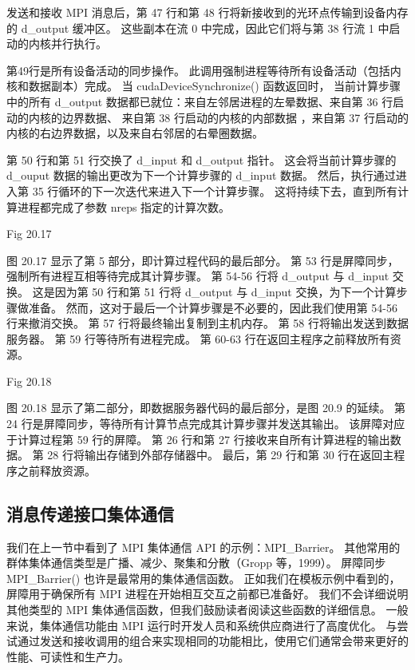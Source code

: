 发送和接收 MPI 消息后，第 47 行和第 48 行将新接收到的光环点传输到设备内存的 d\_output 缓冲区。 
这些副本在流 0 中完成，因此它们将与第 38 行流 1 中启动的内核并行执行。

第49行是所有设备活动的同步操作。 此调用强制进程等待所有设备活动（包括内核和数据副本）完成。 
当 cudaDeviceSynchronize() 函数返回时，
当前计算步骤中的所有 d\_output 数据都已就位：来自左邻居进程的左晕数据、来自第 36 行启动的内核的边界数据、
来自第 38 行启动的内核的内部数据 ，来自第 37 行启动的内核的右边界数据，以及来自右邻居的右晕圈数据。

第 50 行和第 51 行交换了 d\_input 和 d\_output 指针。 
这会将当前计算步骤的 d\_ouput 数据的输出更改为下一个计算步骤的 d\_input 数据。 
然后，执行通过进入第 35 行循环的下一次迭代来进入下一个计算步骤。 
这将持续下去，直到所有计算进程都完成了参数 nreps 指定的计算次数。

{\color{red} Fig 20.17}

图 20.17 显示了第 5 部分，即计算过程代码的最后部分。 第 53 行是屏障同步，强制所有进程互相等待完成其计算步骤。 
第 54-56 行将 d\_output 与 d\_input 交换。 
这是因为第 50 行和第 51 行将 d\_output 与 d\_input 交换，为下一个计算步骤做准备。 
然而，这对于最后一个计算步骤是不必要的，因此我们使用第 54-56 行来撤消交换。 第 57 行将最终输出复制到主机内存。 
第 58 行将输出发送到数据服务器。 第 59 行等待所有进程完成。 第 60-63 行在返回主程序之前释放所有资源。

{\color{red} Fig 20.18}

图 20.18 显示了第二部分，即数据服务器代码的最后部分，是图 20.9 的延续。 
第 24 行是屏障同步，等待所有计算节点完成其计算步骤并发送其输出。 该屏障对应于计算过程第 59 行的屏障。 
第 26 行和第 27 行接收来自所有计算进程的输出数据。 第 28 行将输出存储到外部存储器中。 
最后，第 29 行和第 30 行在返回主程序之前释放资源。

\subsection{消息传递接口集体通信}
我们在上一节中看到了 MPI 集体通信 API 的示例：MPI\_Barrier。 
其他常用的群体集体通信类型是广播、减少、聚集和分散（Gropp 等，1999）。 
屏障同步 MPI\_Barrier() 也许是最常用的集体通信函数。 
正如我们在模板示例中看到的，屏障用于确保所有 MPI 进程在开始相互交互之前都已准备好。 
我们不会详细说明其他类型的 MPI 集体通信函数，但我们鼓励读者阅读这些函数的详细信息。 
一般来说，集体通信功能由 MPI 运行时开发人员和系统供应商进行了高度优化。 
与尝试通过发送和接收调用的组合来实现相同的功能相比，使用它们通常会带来更好的性能、可读性和生产力。

